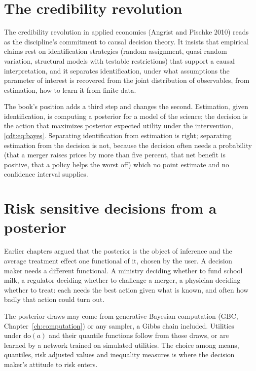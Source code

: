 \section{The credibility revolution}\label{cdt:sec:credibility}

The credibility revolution in applied economics (Angrist and Pischke 2010) reads as the discipline's commitment to causal decision theory. It insists that empirical claims rest on identification strategies (random assignment, quasi random variation, structural models with testable restrictions) that support a causal interpretation, and it separates identification, under what assumptions the parameter of interest is recovered from the joint distribution of observables, from estimation, how to learn it from finite data.

The book's position adds a third step and changes the second. Estimation, given identification, is computing a posterior for a model of the science; the decision is the action that maximizes posterior expected utility under the intervention, \eqref{cdt:eq:bayes}. Separating identification from estimation is right; separating estimation from the decision is not, because the decision often needs a probability (that a merger raises prices by more than five percent, that net benefit is positive, that a policy helps the worst off) which no point estimate and no confidence interval supplies.

\section{Risk sensitive decisions from a posterior}\label{gbc:sec:decisions}

Earlier chapters argued that the posterior is the object of inference and the average treatment effect one functional of it, chosen by the user. A decision maker needs a different functional. A ministry deciding whether to fund school milk, a regulator deciding whether to challenge a merger, a physician deciding whether to treat: each needs the best action given what is known, and often how badly that action could turn out.

The posterior draws may come from generative Bayesian computation (GBC, Chapter~\ref{ch:computation}) or any sampler, a Gibbs chain included. Utilities under $\mathrm{do}(a)$ and their quantile functions follow from those draws, or are learned by a network trained on simulated utilities. The choice among means, quantiles, risk adjusted values and inequality measures is where the decision maker's attitude to risk enters.

